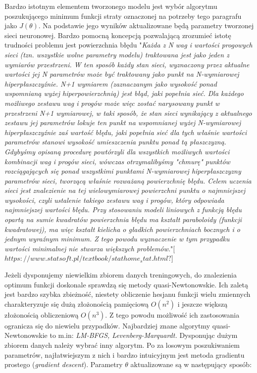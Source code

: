 \documentclass[]{article}
\theoremstyle{definition}
\begin{document}
Bardzo istotnym elementem tworzonego modelu jest wybór algorytmu poszukującego minimum funkcji straty oznaczonej na potrzeby tego paragrafu jako $J(\theta)$. Na podstawie jego wyników aktualizowane będą parametry tworzonej sieci neuronowej. Bardzo pomocną koncepcją pozwalającą zrozumieć istotę trudności problemu jest powierzchnia błędu "\textit{Każda z N wag i wartości progowych sieci (tzn. wszystkie wolne parametry modelu) traktowana jest jako jeden z wymiarów przestrzeni. W ten sposób każdy stan sieci, wyznaczony przez aktualne wartości jej N parametrów może być traktowany jako punkt na N-wymiarowej hiperpłaszczyźnie. N+1 wymiarem (zaznaczanym jako wysokość ponad wspomnianą wyżej hiperpowierzchnią) jest błąd, jaki popełnia sieć. Dla każdego możliwego zestawu wag i progów może więc zostać narysowany punkt w przestrzeni N+1 wymiarowej, w taki sposób, że stan sieci wynikający z aktualnego zestawu jej parametrów lokuje ten punkt na wspomnianej wyżej N-wymiarowej hiperpłaszczyźnie zaś wartość błędu, jaki popełnia sieć dla tych właśnie wartości parametrów stanowi wysokość umieszczenia punktu ponad tą płaszczyzną. Gdybyśmy opisaną procedurę powtórzyli dla wszystkich możliwych wartości kombinacji wag i progów sieci, wówczas otrzymalibyśmy "chmurę" punktów rozciągających się ponad wszystkimi punktami N-wymiarowej hiperpłaszczyzny parametrów sieci, tworzącą właśnie rozważaną powierzchnię błędu. Celem uczenia sieci jest znalezienie na tej wielowymiarowej powierzchni punktu o najmniejszej wysokości, czyli ustalenie takiego zestawu wag i progów, który odpowiada najmniejszej wartości błędu.
Przy stosowaniu modeli liniowych z funkcją błędu opartą na sumie kwadratów powierzchnia błędu ma kształt paraboloidy (funkcji kwadratowej), ma więc kształt kielicha o gładkich powierzchniach bocznych i o jednym wyraźnym minimum. Z tego powodu wyznaczenie w tym przypadku wartości minimalnej nie stwarza większych problemów.}"[$https://www.statsoft.pl/textbook/stathome_stat.html?$]

Jeżeli dysponujemy niewielkim zbiorem danych treningowych, do znalezienia optimum funkcji doskonale sprawdzą się metody quasi-Newtonowskie. Ich zaletą jest bardzo szybka zbieżność, niestety obliczenie hesjanu funkcji wielu zmiennych charakteryzuje się dużą złożonością pamięciową $O(n^2)$ i jeszcze większą złożonością obliczeniową $O(n^3)$. Z tego powodu możliwość ich zastosowania ogranicza się do niewielu przypadków. Najbardziej znane algorytmy quasi-Newtonowskie to m.in: \textit{LM-BFGS, Levenberg-Marquardt.} Dysponując dużym zbiorem danych należy wybrać inny algorytm. Po za losowym poszukiwaniem parametrów, najłatwiejszym z nich i bardzo intuicyjnym jest metoda gradientu prostego (\textit{gradient descent}). Parametry $\theta$ aktualizowane są w następujący sposób:
\end{document}
